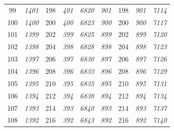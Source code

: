 \documentclass[10pt,fleqn]{article}
\begin{document}
\begin{longtable}{c|cccccccc}
99 & {\color{blue} \it 1401 \rm} & {\color{black} 198} & {\color{blue} \it 401 \rm} & {\color{blue} \it 6820 \rm} & {\color{blue} \it 901 \rm} & {\color{black} 198} & {\color{blue} \it 901 \rm} & {\color{blue} \it 7114 \rm} \\
100 & {\color{blue} \it 1400 \rm} & {\color{black} 200} & {\color{blue} \it 400 \rm} & {\color{blue} \it 6823 \rm} & {\color{blue} \it 900 \rm} & {\color{black} 200} & {\color{blue} \it 900 \rm} & {\color{blue} \it 7117 \rm} \\
101 & {\color{blue} \it 1399 \rm} & {\color{black} 202} & {\color{blue} \it 399 \rm} & {\color{blue} \it 6825 \rm} & {\color{blue} \it 899 \rm} & {\color{black} 202} & {\color{blue} \it 899 \rm} & {\color{blue} \it 7120 \rm} \\
102 & {\color{blue} \it 1398 \rm} & {\color{black} 204} & {\color{blue} \it 398 \rm} & {\color{blue} \it 6828 \rm} & {\color{blue} \it 898 \rm} & {\color{black} 204} & {\color{blue} \it 898 \rm} & {\color{blue} \it 7123 \rm} \\
103 & {\color{blue} \it 1397 \rm} & {\color{black} 206} & {\color{blue} \it 397 \rm} & {\color{blue} \it 6830 \rm} & {\color{blue} \it 897 \rm} & {\color{black} 206} & {\color{blue} \it 897 \rm} & {\color{blue} \it 7126 \rm} \\
104 & {\color{blue} \it 1396 \rm} & {\color{black} 208} & {\color{blue} \it 396 \rm} & {\color{blue} \it 6833 \rm} & {\color{blue} \it 896 \rm} & {\color{black} 208} & {\color{blue} \it 896 \rm} & {\color{blue} \it 7129 \rm} \\
105 & {\color{blue} \it 1395 \rm} & {\color{black} 210} & {\color{blue} \it 395 \rm} & {\color{blue} \it 6835 \rm} & {\color{blue} \it 895 \rm} & {\color{black} 210} & {\color{blue} \it 895 \rm} & {\color{blue} \it 7131 \rm} \\
106 & {\color{blue} \it 1394 \rm} & {\color{black} 212} & {\color{blue} \it 394 \rm} & {\color{blue} \it 6838 \rm} & {\color{blue} \it 894 \rm} & {\color{black} 212} & {\color{blue} \it 894 \rm} & {\color{blue} \it 7134 \rm} \\
107 & {\color{blue} \it 1393 \rm} & {\color{black} 214} & {\color{blue} \it 393 \rm} & {\color{blue} \it 6840 \rm} & {\color{blue} \it 893 \rm} & {\color{black} 214} & {\color{blue} \it 893 \rm} & {\color{blue} \it 7137 \rm} \\
108 & {\color{blue} \it 1392 \rm} & {\color{black} 216} & {\color{blue} \it 392 \rm} & {\color{blue} \it 6843 \rm} & {\color{blue} \it 892 \rm} & {\color{black} 216} & {\color{blue} \it 892 \rm} & {\color{blue} \it 7140 \rm} \\

\end{longtable}
\end{document}
